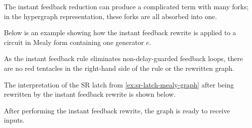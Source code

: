The instant feedback reduction can produce a complicated term with many forks;
in the hypergraph representation, these forks are all absorbed into one.

\begin{example}\label{ex:instant-feedback-rewrite}
    Below is an example showing how the instant feedback rewrite is applied to
    a circuit in Mealy form containing one generator \(e\).
    \begin{center}
        
    \end{center}
\end{example}

As the instant feedback rule eliminates non-delay-guarded feedback loops, there
are no red tentacles in the right-hand side of the rule or the rewritten graph.

\begin{example}\label{ex:sr-latch-instant-feedback-graph}
    The interpretation of the SR latch from \cref{ex:sr-latch-mealy-graph}
    after being rewritten by the instant feedback rewrite is shown below.
    \vspace{-1em}
    \begin{center}
    \end{center}
\end{example}

After performing the instant feedback rewrite, the graph is ready to receive
inputs.

